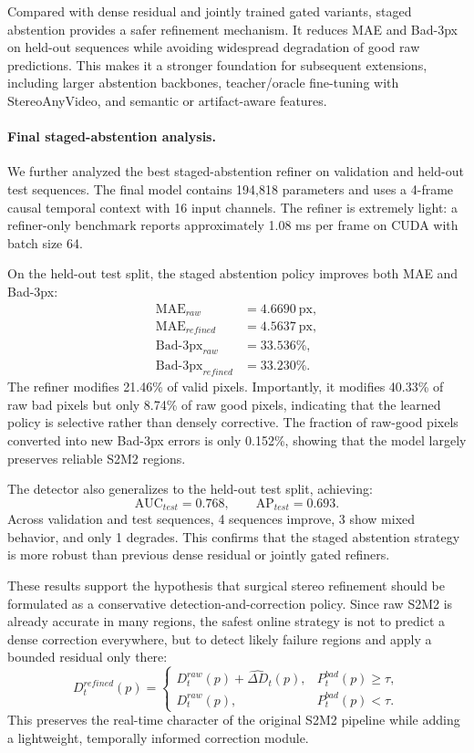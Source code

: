 \documentclass[11pt,a4paper]{article}
\begin{document}
Compared with dense residual and jointly trained gated variants, staged
abstention provides a safer refinement mechanism. It reduces MAE and Bad-3px on
held-out sequences while avoiding widespread degradation of good raw predictions.
This makes it a stronger foundation for subsequent extensions, including larger
abstention backbones, teacher/oracle fine-tuning with StereoAnyVideo, and
semantic or artifact-aware features.

\paragraph{Final staged-abstention analysis.}
We further analyzed the best staged-abstention refiner on validation and held-out
test sequences. The final model contains 194,818 parameters and uses a 4-frame
causal temporal context with 16 input channels. The refiner is extremely light:
a refiner-only benchmark reports approximately 1.08 ms per frame on CUDA with
batch size 64.

On the held-out test split, the staged abstention policy improves both MAE and
Bad-3px:
\[
\begin{aligned}
\mathrm{MAE}_{raw} &= 4.6690~\mathrm{px}, \\
\mathrm{MAE}_{refined} &= 4.5637~\mathrm{px}, \\
\mathrm{Bad}\text{-}3\mathrm{px}_{raw} &= 33.536\%, \\
\mathrm{Bad}\text{-}3\mathrm{px}_{refined} &= 33.230\%.
\end{aligned}
\]
The refiner modifies 21.46\% of valid pixels. Importantly, it modifies 40.33\%
of raw bad pixels but only 8.74\% of raw good pixels, indicating that the learned
policy is selective rather than densely corrective. The fraction of raw-good
pixels converted into new Bad-3px errors is only 0.152\%, showing that the model
largely preserves reliable S2M2 regions.

The detector also generalizes to the held-out test split, achieving:
\[
\mathrm{AUC}_{test} = 0.768,
\qquad
\mathrm{AP}_{test} = 0.693.
\]
Across validation and test sequences, 4 sequences improve, 3 show mixed behavior,
and only 1 degrades. This confirms that the staged abstention strategy is more
robust than previous dense residual or jointly gated refiners.

These results support the hypothesis that surgical stereo refinement should be
formulated as a conservative detection-and-correction policy. Since raw S2M2 is
already accurate in many regions, the safest online strategy is not to predict a
dense correction everywhere, but to detect likely failure regions and apply a
bounded residual only there:
\[
D_t^{refined}(p)
=
\begin{cases}
D_t^{raw}(p) + \widehat{\Delta D}_t(p),
&
P_t^{bad}(p) \geq \tau, \\
D_t^{raw}(p),
&
P_t^{bad}(p) < \tau.
\end{cases}
\]
This preserves the real-time character of the original S2M2 pipeline while
adding a lightweight, temporally informed correction module.
\end{document}
